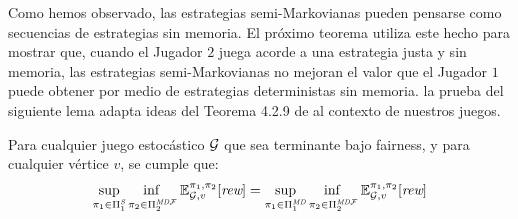 %	
%	



Como hemos observado, las estrategias semi-Markovianas pueden pensarse como secuencias de estrategias sin memoria. El próximo teorema utiliza este hecho para mostrar que, cuando el Jugador $2$ juega acorde a una estrategia justa y sin memoria,  las estrategias semi-Markovianas no mejoran el valor que el Jugador $1$ puede obtener por medio de estrategias deterministas sin memoria. la prueba del siguiente lema adapta ideas del Teorema 4.2.9 de \cite{FilarV96} al contexto de nuestros juegos.%

\begin{lemma}\label{lm:semimarkov-to-detmemoryless} Para cualquier juego estocástico $\mathcal{G}$  que sea terminante bajo fairness, y para cualquier vértice $v$, se cumple que:
\[\adjustlimits
	\sup_{\strat{1} \in \SemiMarkovStrats{1}} \inf_{\strat{2} \in \DetMemorylessFairStrats{2}} \Expect{\strat{1}}{\strat{2}}_{\StochG,v}[\Rewards]
	= \adjustlimits
	\sup_{\strat{1} \in \DetMemorylessStrats{1}} \inf_{\strat{2} \in \DetMemorylessFairStrats{2}} \Expect{\strat{1}}{\strat{2}}_{\StochG,v}[\Rewards]
\]
\end{lemma}

